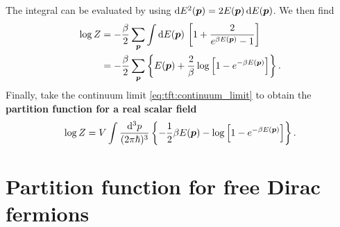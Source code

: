 The integral can be evaluated by using $\mathop{}\!\mathrm{d} E^2({\bm{p}}) = 2 E({\bm{p}}) \mathop{}\!\mathrm{d} E({\bm{p}})$.
We then find
\begin{equation}
\begin{split}
	\log Z &= -\frac{\beta}{2} \sum_{\bm{p}} \int \mathop{}\!\mathrm{d} E  ({\bm{p}}) \, \left[ 1 + \frac{2}{e^{\beta E({\bm{p}})} - 1} \right] \\
	       &= -\frac{\beta}{2} \sum_{\bm{p}} \left\{ E({\bm{p}}) + \frac{2}{\beta} \log \left[ 1 - e^{-\beta E({\bm{p}})} \right] \right\} .
\end{split}
\end{equation}
Finally, take the continuum limit \eqref{eq:tft:continuum_limit} to obtain the \textbf{partition function for a real scalar field}
\begin{equation}
	\log Z = V \int \frac{\mathop{}\!\mathrm{d}^3 p}{(2 \pi \hbar)^3} \left\{ -\frac12 \beta E({\bm{p}}) - \log \left[ 1 - e^{-\beta E({\bm{p}})} \right] \right\} .
\label{eq:tft:real_scalar_field_partition_function}
\end{equation}

\section{Partition function for free Dirac fermions}

